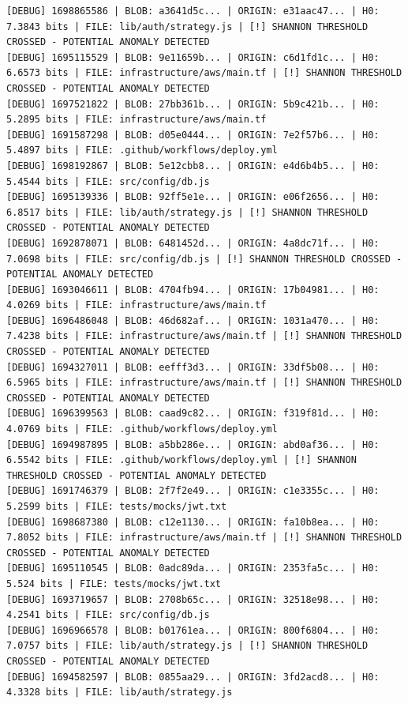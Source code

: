 \documentclass[12pt, a4paper, oneside]{report}
\begin{document}
\begin{lstlisting}[basicstyle=\tiny\ttfamily]
[DEBUG] 1698865586 | BLOB: a3641d5c... | ORIGIN: e31aac47... | H0: 7.3843 bits | FILE: lib/auth/strategy.js | [!] SHANNON THRESHOLD CROSSED - POTENTIAL ANOMALY DETECTED
[DEBUG] 1695115529 | BLOB: 9e11659b... | ORIGIN: c6d1fd1c... | H0: 6.6573 bits | FILE: infrastructure/aws/main.tf | [!] SHANNON THRESHOLD CROSSED - POTENTIAL ANOMALY DETECTED
[DEBUG] 1697521822 | BLOB: 27bb361b... | ORIGIN: 5b9c421b... | H0: 5.2895 bits | FILE: infrastructure/aws/main.tf
[DEBUG] 1691587298 | BLOB: d05e0444... | ORIGIN: 7e2f57b6... | H0: 5.4897 bits | FILE: .github/workflows/deploy.yml
[DEBUG] 1698192867 | BLOB: 5e12cbb8... | ORIGIN: e4d6b4b5... | H0: 5.4544 bits | FILE: src/config/db.js
[DEBUG] 1695139336 | BLOB: 92ff5e1e... | ORIGIN: e06f2656... | H0: 6.8517 bits | FILE: lib/auth/strategy.js | [!] SHANNON THRESHOLD CROSSED - POTENTIAL ANOMALY DETECTED
[DEBUG] 1692878071 | BLOB: 6481452d... | ORIGIN: 4a8dc71f... | H0: 7.0698 bits | FILE: src/config/db.js | [!] SHANNON THRESHOLD CROSSED - POTENTIAL ANOMALY DETECTED
[DEBUG] 1693046611 | BLOB: 4704fb94... | ORIGIN: 17b04981... | H0: 4.0269 bits | FILE: infrastructure/aws/main.tf
[DEBUG] 1696486048 | BLOB: 46d682af... | ORIGIN: 1031a470... | H0: 7.4238 bits | FILE: infrastructure/aws/main.tf | [!] SHANNON THRESHOLD CROSSED - POTENTIAL ANOMALY DETECTED
[DEBUG] 1694327011 | BLOB: eefff3d3... | ORIGIN: 33df5b08... | H0: 6.5965 bits | FILE: infrastructure/aws/main.tf | [!] SHANNON THRESHOLD CROSSED - POTENTIAL ANOMALY DETECTED
[DEBUG] 1696399563 | BLOB: caad9c82... | ORIGIN: f319f81d... | H0: 4.0769 bits | FILE: .github/workflows/deploy.yml
[DEBUG] 1694987895 | BLOB: a5bb286e... | ORIGIN: abd0af36... | H0: 6.5542 bits | FILE: .github/workflows/deploy.yml | [!] SHANNON THRESHOLD CROSSED - POTENTIAL ANOMALY DETECTED
[DEBUG] 1691746379 | BLOB: 2f7f2e49... | ORIGIN: c1e3355c... | H0: 5.2599 bits | FILE: tests/mocks/jwt.txt
[DEBUG] 1698687380 | BLOB: c12e1130... | ORIGIN: fa10b8ea... | H0: 7.8052 bits | FILE: infrastructure/aws/main.tf | [!] SHANNON THRESHOLD CROSSED - POTENTIAL ANOMALY DETECTED
[DEBUG] 1695110545 | BLOB: 0adc89da... | ORIGIN: 2353fa5c... | H0: 5.524 bits | FILE: tests/mocks/jwt.txt
[DEBUG] 1693719657 | BLOB: 2708b65c... | ORIGIN: 32518e98... | H0: 4.2541 bits | FILE: src/config/db.js
[DEBUG] 1696966578 | BLOB: b01761ea... | ORIGIN: 800f6804... | H0: 7.0757 bits | FILE: lib/auth/strategy.js | [!] SHANNON THRESHOLD CROSSED - POTENTIAL ANOMALY DETECTED
[DEBUG] 1694582597 | BLOB: 0855aa29... | ORIGIN: 3fd2acd8... | H0: 4.3328 bits | FILE: lib/auth/strategy.js

\end{lstlisting}
\end{document}
